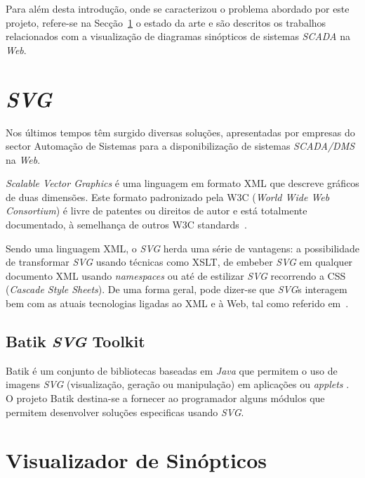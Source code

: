 \documentclass[twocolumn,twoside,11pt]{article}
\newcommand{\class}[1]{{\normalfont\slshape #1\/}}
\newcommand{\svg}{\class{SVG}}
\newcommand{\scada}{\class{SCADA}}
\newcommand{\scadadms}{\class{SCADA/DMS}}
\begin{document}
\lipsum[2]

Para além desta introdução, onde se caracterizou o problema abordado
por este projeto, refere-se na Secção~\ref{sec:sota} o
estado da arte e são descritos os trabalhos relacionados com a
visualização de diagramas sinópticos de sistemas \scada{} na
\textit{Web}. 


\section{\svg}\label{sec:sota}

Nos últimos tempos têm surgido diversas soluções, apresentadas por
empresas do sector Automação de Sistemas para a disponibilização de
sistemas \scadadms{} na \textit{Web}.

\emph{Scalable Vector Graphics} é uma linguagem em formato XML que
descreve gráficos de duas dimensões. 
Este formato padronizado pela W3C (\emph{World Wide Web Consortium})
é livre de patentes ou direitos de autor e está totalmente
documentado, à semelhança de outros W3C standards~\cite{kn:svgdoc}.

Sendo uma linguagem XML, o \svg{} herda uma série de vantagens: a
possibilidade de transformar \svg{} usando técnicas como XSLT, de embeber
\svg{} em qualquer documento XML usando \textit{namespaces} ou até de 
estilizar \svg{} recorrendo a CSS (\emph{Cascade Style Sheets}). 
De uma forma geral, pode dizer-se que \svg{}s interagem bem com as
atuais tecnologias ligadas ao XML e à Web, tal como referido
em~\cite{kn:svgibm,kn:svgw3c}.

\subsection{Batik \svg{} Toolkit} \label{batik} 

Batik é um conjunto de bibliotecas baseadas em \textit{Java} que
permitem o uso de imagens \svg{} (visualização, geração ou
manipulação) em aplicações ou \textit{applets} \cite{kn:batikarchitecture}.  
O projeto Batik destina-se a fornecer ao programador alguns módulos
que permitem desenvolver soluções especificas usando \svg. 

\lipsum[3]


\section{Visualizador de Sinópticos}\label{sec:application}
\end{document}
